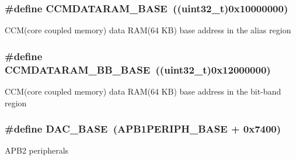 \subsubsection[{\texorpdfstring{C\+C\+M\+D\+A\+T\+A\+R\+A\+M\+\_\+\+B\+A\+SE}{CCMDATARAM_BASE}}]{\setlength{\rightskip}{0pt plus 5cm}\#define C\+C\+M\+D\+A\+T\+A\+R\+A\+M\+\_\+\+B\+A\+SE~((uint32\+\_\+t)0x10000000)}\hypertarget{group___peripheral__memory__map_gabea1f1810ebeac402164b42ab54bcdf9}{}\label{group___peripheral__memory__map_gabea1f1810ebeac402164b42ab54bcdf9}
C\+C\+M(core coupled memory) data R\+A\+M(64 K\+B) base address in the alias region 
\subsubsection[{\texorpdfstring{C\+C\+M\+D\+A\+T\+A\+R\+A\+M\+\_\+\+B\+B\+\_\+\+B\+A\+SE}{CCMDATARAM_BB_BASE}}]{\setlength{\rightskip}{0pt plus 5cm}\#define C\+C\+M\+D\+A\+T\+A\+R\+A\+M\+\_\+\+B\+B\+\_\+\+B\+A\+SE~((uint32\+\_\+t)0x12000000)}\hypertarget{group___peripheral__memory__map_gaf98d1f99ecd952ee59e80b345d835bb0}{}\label{group___peripheral__memory__map_gaf98d1f99ecd952ee59e80b345d835bb0}
C\+C\+M(core coupled memory) data R\+A\+M(64 K\+B) base address in the bit-\/band region 
\subsubsection[{\texorpdfstring{D\+A\+C\+\_\+\+B\+A\+SE}{DAC_BASE}}]{\setlength{\rightskip}{0pt plus 5cm}\#define D\+A\+C\+\_\+\+B\+A\+SE~(A\+P\+B1\+P\+E\+R\+I\+P\+H\+\_\+\+B\+A\+SE + 0x7400)}\hypertarget{group___peripheral__memory__map_gad18d0b914c7f68cecbee1a2d23a67d38}{}\label{group___peripheral__memory__map_gad18d0b914c7f68cecbee1a2d23a67d38}
A\+P\+B2 peripherals 
